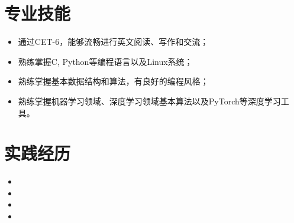 \documentclass{resume}
\begin{document}
\section{专业技能}
\begin{itemize}[parsep=0.5ex]
	\item 通过CET-6，能够流畅进行英文阅读、写作和交流；
	\item 熟练掌握C, Python等编程语言以及Linux系统；
	\item 熟练掌握基本数据结构和算法，有良好的编程风格；
	\item 熟练掌握机器学习领域、深度学习领域基本算法以及PyTorch等深度学习工具。
\end{itemize}

\section{实践经历}
\begin{itemize}[parsep=0.5ex]
  \item {}	
  \item {}
  \item {}
  \item {}
\end{itemize}
\end{document}
